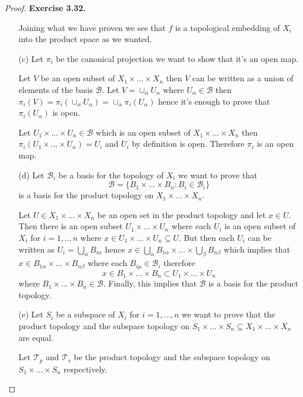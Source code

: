 \documentclass[11pt]{article}
\newcommand{\Topo}{\mathcal{T}}
\theoremstyle{definition}
\begin{document}
\begin{proof}{\textbf{Exercise 3.32.}}
\begin{itemize}
    Joining what we have proven we see that $f$ is a topological embedding of
    $X_i$ into the product space as we wanted.

    \item [(c)] Let $\pi_i$ be the canonical projection we want to show
    that it's an open map.

    Let $V$ be an open subset of $X_1 \times ... \times X_n$ then $V$ can be
    written as a union of elements of the basis $\mathcal{B}$. Let
    $V = \cup_\alpha U_\alpha$ where $U_\alpha \in \mathcal{B}$ then
    $\pi_i(V) = \pi_i(\cup_\alpha U_\alpha) = \cup_\alpha \pi_i(U_\alpha)$
    hence it's enough to prove that $\pi_i(U_\alpha)$ is open.

    Let $U_1 \times ... \times U_n \in \mathcal{B}$ which is an open subset of
    $X_1 \times ... \times X_n$ then $\pi_i(U_1 \times ... \times U_n) = U_i$
    and $U_i$ by definition is open. Therefore $\pi_i$ is an open map.

    \item [(d)] Let $\mathcal{B}_i$ be a basis for the topology of $X_i$
    we want to prove that
    $$\mathcal{B} = \{B_1 \times ... \times B_n: B_i \in \mathcal{B}_i\}$$
    is a basis for the product topology on $X_1 \times ... \times X_n$.

    Let $U \in X_1 \times ... \times X_n$ be an open set in the product
    topology and let $x \in U$.
    Then there is an open subset $U_1 \times ... \times U_n$ where each $U_i$
    is an open subset of $X_i$ for $i =1,..,n$
    where $x \in U_1 \times ... \times U_n \subseteq U$.
    But then each $U_i$ can be written as $U_i = \bigcup_\alpha B_{i\alpha}$
    hence
    $x \in \bigcup_\alpha B_{1\alpha} \times ... \times \bigcup_\beta B_{n\beta}$
    which implies that $x \in B_{1\alpha} \times ... \times B_{n\beta}$
    where each $B_{i\mu} \in \mathcal{B}_i$ therefore
    $$x \in B_1 \times ...\times B_n \subset U_1 \times ... \times U_n$$
    where $B_1 \times ...\times B_n \in \mathcal{B}$.
    Finally, this implies that $\mathcal{B}$ is a basis
    for the product topology.
\cleardoublepage
    \item [(e)] Let $S_i$ be a subspace of $X_i$ for $i = 1,...,n$ we want to
    prove that the product topology and the subspace topology on
    $S_1 \times ... \times S_n \subseteq X_1 \times ... \times X_n$ are
    equal.

    Let $\Topo_p$ and $\Topo_s$ be the product topology and 
    the subspace topology on $S_1 \times ... \times S_n$ respectively.
    

\end{itemize}
\end{proof}
\end{document}
